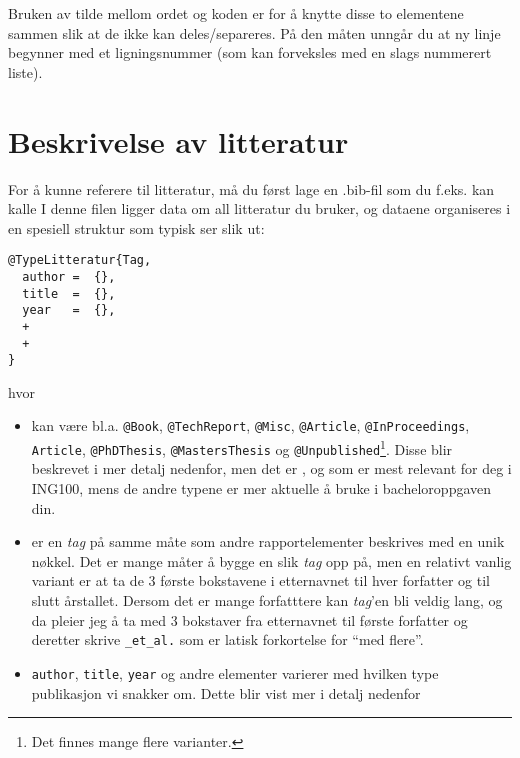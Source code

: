Bruken av tilde mellom ordet  og koden  er for å knytte disse to elementene
sammen slik at de ikke kan deles/separeres. På den måten unngår du at
ny linje begynner med et ligningsnummer (som kan forveksles med en
slags nummerert liste).

\newpage
\section{Beskrivelse av litteratur}
For å kunne referere til litteratur, må du først lage en .bib-fil som du f.eks. kan
kalle  I denne filen ligger data om all
litteratur du bruker, og dataene organiseres i en spesiell struktur som 
typisk ser slik ut:

\begin{boxedminipage}{\textwidth}
\begin{verbatim}
@TypeLitteratur{Tag,
  author =  {},
  title  =  {},
  year   =  {},
  +
  +
}
\end{verbatim}
\end{boxedminipage}

hvor 
\begin{itemize}
\item  {} kan være bl.a. {\tt @Book}, 
  {\tt @TechReport}, {\tt @Misc}, {\tt @Article}, {\tt @InProceedings}, {\tt Article}, 
  {\tt @PhDThesis},  {\tt @MastersThesis} og {\tt @Unpublished}\footnote{Det
  finnes mange flere varianter.}. Disse blir
  beskrevet i mer detalj nedenfor, men det 
  er , 
   og  som er mest relevant for deg 
  i ING100, mens de
  andre typene er mer aktuelle å bruke i bacheloroppgaven din.
  
\item {} er en {\em tag} på samme måte som andre
  rapportelementer beskrives med en unik nøkkel. Det er mange måter å
  bygge en slik {\em tag} opp på, men en relativt vanlig variant er at
  ta de 3 første bokstavene i etternavnet til hver forfatter og til
  slutt årstallet. Dersom det er mange forfatttere kan {\em tag}'en
  bli veldig lang, og da pleier jeg å ta med 3 bokstaver fra
  etternavnet til første forfatter og deretter skrive {\tt \_et\_al.}
  som er latisk forkortelse for ``med flere''.  
\item {\tt author}, {\tt title}, {\tt year} og andre elementer
  varierer med hvilken type publikasjon vi snakker om. Dette blir vist
  mer i detalj nedenfor
\end{itemize}


